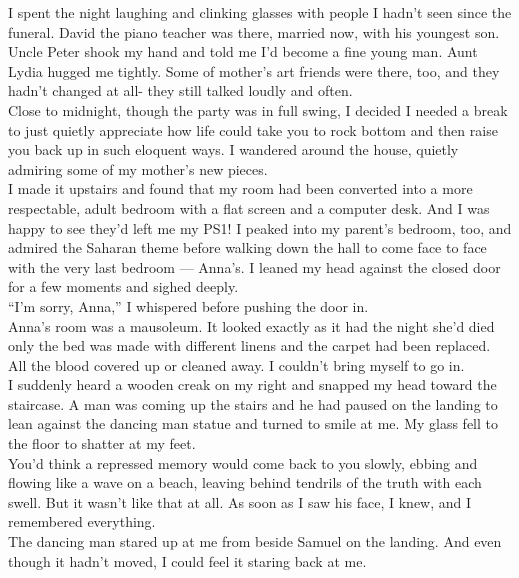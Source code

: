 \documentclass[a5paper]{scrartcl}
\begin{document}
I spent the night laughing and clinking glasses with people I hadn't seen since the funeral. David the piano teacher was there, married now, with his youngest son. Uncle Peter shook my hand and told me I'd become a fine young man. Aunt Lydia hugged me tightly. Some of mother's art friends were there, too, and they hadn't changed at all- they still talked loudly and often. \\


Close to midnight, though the party was in full swing, I decided I needed a break to just quietly appreciate how life could take you to rock bottom and then raise you back up in such eloquent ways.  I wandered around the house, quietly admiring some of my mother's new pieces.\\


I made it upstairs and found that my room had been converted into a more respectable, adult bedroom with a flat screen and a computer desk. And I was happy to see they'd left me my PS1! I peaked into my parent's bedroom, too, and admired the Saharan theme before walking down the hall to come face to face with the very last bedroom --- Anna's. I leaned my head against the closed door for a few moments and sighed deeply.\\


\enquote{I'm sorry, Anna,} I whispered before pushing the door in.\\


Anna's room was a mausoleum. It looked exactly as it had the night she'd died only the bed was made with different linens and the carpet had been replaced. All the blood covered up or cleaned away. I couldn't bring myself to go in.\\


I suddenly heard a wooden creak on my right and snapped my head toward the staircase. A man was coming up the stairs and he had paused on the landing to lean against the dancing man statue and turned to smile at me. My glass fell to the floor to shatter at my feet.\\


You'd think a repressed memory would come back to you slowly, ebbing and flowing like a wave on a beach, leaving behind tendrils of the truth with each swell. But it wasn't like that at all. As soon as I saw his face, I knew, and I remembered everything. \\


The dancing man stared up at me from beside Samuel on the landing. And even though it hadn't moved, I could feel it staring back at me. \\
\end{document}
